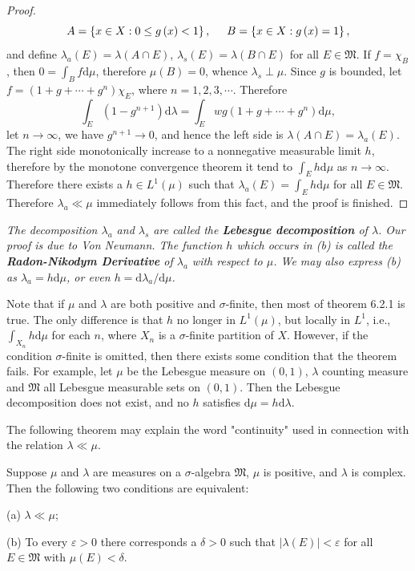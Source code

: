 \begin{proof}
$$
A=\left\{ x\in X:0\le g\left( x \right) <1 \right\} ,\hspace{0.5cm}B=\left\{ x\in X:g\left( x \right) =1 \right\} ,
$$
and define $\lambda_a(E)=\lambda(A\cap E)$, $\lambda_s(E)=\lambda(B\cap E)$ for all $E\in\mathfrak{M}$. If $f=\chi_B$, then $0=\int_Bf\mathrm{d}\mu$, therefore $\mu(B)=0$, whence $\lambda_s\perp\mu$. Since $g$ is bounded, let $f=(1+g+\cdots+g^n)\chi_E$, where $n=1,2,3,\cdots$. Therefore 
$$
\int_E{\left( 1-g^{n+1} \right) \mathrm{d}\lambda}=\int_E{wg\left( 1+g+\cdots +g^n \right) \mathrm{d}\mu},
$$
let $n\to\infty$, we have $g^{n+1}\to 0$, and hence the left side is $\lambda(A\cap E)=\lambda_a(E)$. The right side monotonically increase to a nonnegative measurable limit $h$, therefore by the monotone convergence theorem it tend to $\int_Eh\mathrm{d}\mu$ as $n\to\infty$. Therefore there exists a $h\in L^1(\mu)$ such that $\lambda_a(E)=\int_Eh\mathrm{d}\mu$ for all $E\in\mathfrak{M}$. Therefore $\lambda_a\ll\mu$ immediately follows from this fact, and the proof is finished.
\end{proof}
\begin{note}\em
The decomposition $\lambda_a$ and $\lambda_s$ are called the \textbf{Lebesgue decomposition} of $\lambda$. Our proof is due to Von Neumann. The function $h$ which occurs in (b) is called the \textbf{Radon-Nikodym Derivative} of $\lambda_a$ with respect to $\mu$. We may also express (b) as $\lambda_a=h\mathrm{d}\mu$, or even $h=\mathrm{d}\lambda_a/\mathrm{d}\mu$.
\end{note}
Note that if $\mu$ and $\lambda$ are both positive and $\sigma$-finite, then most of theorem 6.2.1 is true. The only difference is that $h$ no longer in $L^1(\mu)$, but locally in $L^1$, i.e., $\int_{X_n}h\mathrm{d}\mu$ for each $n$, where $X_n$ is a $\sigma$-finite partition of $X$. However, if the condition $\sigma$-finite is omitted, then there exists some condition that the theorem fails. For example, let $\mu$ be the Lebesgue measure on $(0,1)$, $\lambda$ counting measure and $\mathfrak{M}$ all Lebesgue measurable sets on $(0,1)$. Then the Lebesgue decomposition does not exist, and no $h$ satisfies $\mathrm{d}\mu=h\mathrm{d}\lambda$.\par
The following theorem may explain the word "continuity" used in connection with the relation $\lambda\ll\mu$.
\begin{theorem}
Suppose $\mu$ and $\lambda$ are measures on a $\sigma$-algebra $\mathfrak{M}$, $\mu$ is positive, and $\lambda$ is complex. Then the following two conditions are equivalent:\par
(a) $\lambda\ll\mu$;\par
(b) To every $\varepsilon>0$ there corresponds a $\delta>0$ such that $|\lambda(E)|<\varepsilon$ for all $E\in\mathfrak{M}$ with $\mu(E)<\delta$.
\end{theorem}
